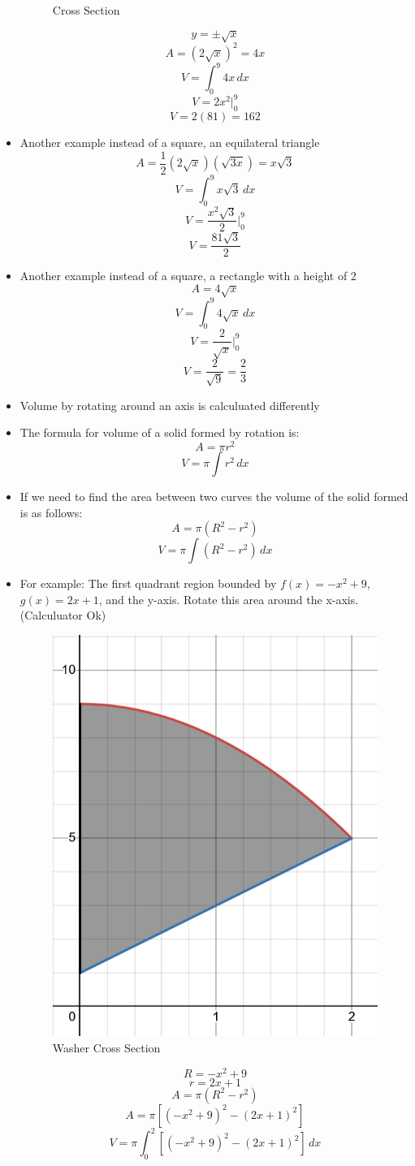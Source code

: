 \documentclass{article}
\newcommand{\intbar}{\biggr\rvert}
\begin{document}
\begin{itemize}
\begin{figure}[h]
        \caption{Cross Section}
        \label{fig:crossSection}
    \end{figure}
        \[y = \pm\sqrt{x}\]
        \[A = \left(2\sqrt{x}\right)^2 = 4x\]
        \[V = \int_0^9 4x\,dx\]
        \[V = 2x^2\intbar_0^9\]
        \[V = 2(81) = \boxed{162}\]
    \item Another example instead of a square, an equilateral triangle
        \[A = \frac{1}{2}\left(2\sqrt{x}\right)\left(\sqrt{3x}\right) = x\sqrt3\]
        \[V = \int_0^9 x\sqrt3\,dx\]
        \[V = \frac{x^2\sqrt3}{2}\intbar_0^9\]
        \[V = \boxed{\frac{81\sqrt3}{2}}\]
    \item Another example instead of a square, a rectangle with a height of 2
        \[A = 4\sqrt{x}\]
        \[V = \int_0^9 4\sqrt{x}\,dx\]
        \[V = \frac{2}{\sqrt{x}}\intbar_0^9\]
        \[V = \frac{2}{\sqrt{9}} = \boxed{\frac{2}{3}}\]
    \item Volume by rotating around an axis is calculuated differently
    \item The formula for volume of a solid formed by rotation is:
        \[A = \pi r^2\]
        \[V = \pi\int r^2\,dx\]
    \item If we need to find the area between two curves the volume of the solid formed is as follows:
        \[A = \pi \left(R^2 - r^2\right)\]
        \[V = \pi\int \left(R^2 - r^2\right)\,dx\]
    \item For example: The first quadrant region bounded by $f(x) = -x^2+9$, $g(x) = 2x+1$, and the y-axis. Rotate this area around the x-axis. (Calculuator Ok)
    \begin{figure}[h]
        \centering
        \includegraphics[width=0.3\linewidth]{images/Washer Cross Section.png}
        \caption{Washer Cross Section}
        \label{fig:washerCrossSection}
    \end{figure}
        \[R = -x^2+9\]
        \[r = 2x+1\]
        \[A = \pi\left(R^2-r^2\right)\]
        \[A = \pi\left[\left(-x^2+9\right)^2-\left(2x+1\right)^2\right]\]
        \[V = \pi\int_0^2\left[\left(-x^2+9\right)^2-\left(2x+1\right)^2\right]\,dx\]

\end{itemize}
\end{document}
